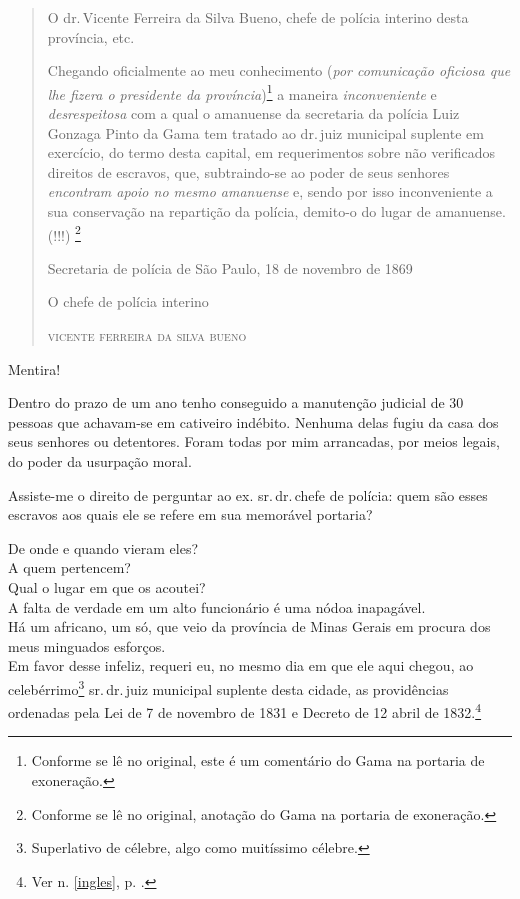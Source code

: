 \begin{quote}
O dr.\,Vicente Ferreira da Silva Bueno, chefe de polícia interino desta
província, etc.

Chegando oficialmente ao meu conhecimento (\emph{por comunicação
oficiosa que lhe fizera o presidente da província})\footnote{Conforme
  se lê no original, este é um comentário do Gama na portaria de
  exoneração.} a maneira \emph{inconveniente} e \emph{desrespeitosa} com
a qual o amanuense da secretaria da polícia Luiz Gonzaga Pinto da Gama
tem tratado ao dr.\,juiz municipal suplente em exercício, do termo desta
capital, em requerimentos sobre não verificados direitos de escravos,
que, subtraindo-se ao poder de seus senhores \emph{encontram apoio no
mesmo amanuense} e, sendo por isso inconveniente a sua conservação na
repartição da polícia, demito-o do lugar de amanuense. (!!!) \footnote{
  Conforme se lê no original, anotação do Gama na portaria de
  exoneração.}

\begin{flushright}
Secretaria de polícia de São Paulo, 18 de novembro de 1869

O chefe de polícia interino

\textsc{vicente ferreira da silva bueno}
\end{flushright}
\end{quote}

Mentira!

Dentro do prazo de um ano tenho conseguido a manutenção judicial de 30
pessoas que achavam-se em cativeiro indébito. Nenhuma delas fugiu da
casa dos seus senhores ou detentores. Foram todas por mim arrancadas,
por meios legais, do poder da usurpação moral.

Assiste-me o direito de perguntar ao ex. sr.\,dr.\,chefe de polícia: quem
são esses escravos aos quais ele se refere em sua memorável portaria?

De onde e quando vieram eles?\\
A quem pertencem?\\
Qual o lugar em que os acoutei?\\
A falta de verdade em um alto funcionário é uma nódoa inapagável.\\
Há um africano, um só, que veio da província de Minas Gerais em procura
dos meus minguados esforços.\\
Em favor desse infeliz, requeri eu, no mesmo dia em que ele aqui chegou,
ao celebérrimo\footnote{Superlativo de célebre, algo como muitíssimo
  célebre.} sr.\,dr.\,juiz municipal suplente desta cidade, as
providências ordenadas pela Lei de 7 de novembro de 1831 e Decreto de 12
abril de 1832.\footnote{Ver n. \ref{ingles}, p. \pageref{ingles}.}


